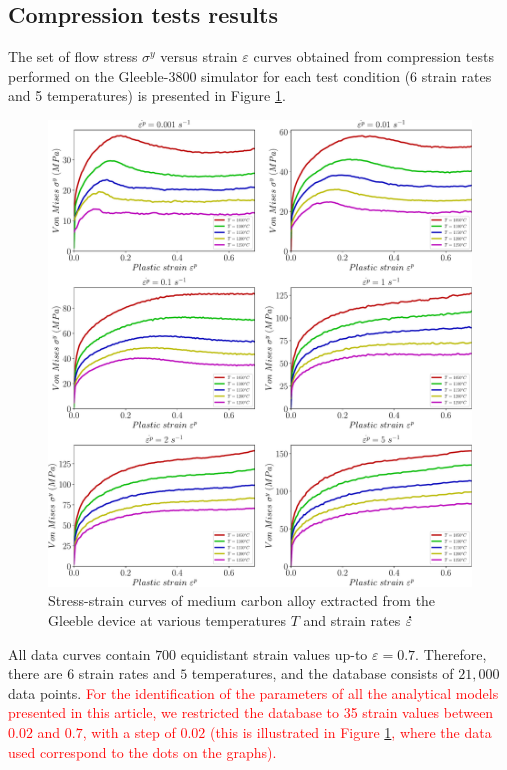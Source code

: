 \documentclass[metals,article,submit,pdftex,moreauthors]{Definitions/mdpi}
\DeclareRobustCommand{\mdot}[1]{\accentset{\mbox{\bfseries .}}{#1}}
\begin{document}
\subsection{Compression tests results\label{sec:ComTestResults}}

The set of flow stress $\sigma^y$ versus strain $\varepsilon$ curves obtained from compression tests performed on the Gleeble-3800 simulator for each test condition (6 strain rates and 5 temperatures) is presented in Figure \ref{fig:RawData}.
\begin{figure}[!ht]
\centering
\includegraphics[width=\columnwidth]{Figures/rawData}
\caption{Stress-strain curves of medium carbon alloy extracted from the Gleeble device at various temperatures $T$ and strain rates $\mdot\varepsilon$}
\label{fig:RawData}
\end{figure}
All data curves contain $700$ equidistant strain values up-to $\varepsilon=0.7$.
Therefore, there are $6$ strain rates and $5$ temperatures, and the database consists of $21,000$ data points.
\textcolor{red}{For the identification of the parameters of all the analytical models presented in this article, we restricted the database to 35 strain values between $0.02$ and $0.7$, with a step of $0.02$ (this is illustrated in Figure \ref{fig:RawData}, where the data used correspond to the dots on the graphs).}
\end{document}
